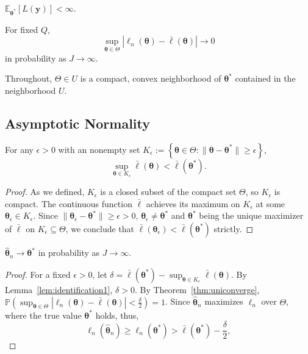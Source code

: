 \begin{proposition}
    $\mathbb{E}_{\bm{\theta}^{*}}[L(\bm{y})]<\infty$.
\end{proposition}

\begin{theorem}
    For fixed $Q$,
    \begin{equation*}
        \sup_{\bm{\theta}\in \Theta}|\ell_{n}(\bm{\theta})-\bar{\ell}(\bm{\theta})|\to 0
    \end{equation*}
    in probability as $J\to \infty$.
    \label{thm:uniconverge}
\end{theorem}

Throughout, $\Theta\in U$ is a compact, convex neighborhood of $\bm{\theta}^{*}$ contained in the neighborhood $U$. 

\subsection{Asymptotic Normality}

\begin{lemma}
    For any $\epsilon>0$ with an nonempty set $K_{\epsilon}:=\left\{\bm{\theta}\in \Theta: \|\bm{\theta}-\bm{\theta}^{*}\|\geq \epsilon\right\}$, 
    \begin{equation*}
        \sup_{\bm{\theta}\in K_{\epsilon}}\bar{\ell}(\bm{\theta})<\bar{\ell}(\bm{\theta}^{*}).
    \end{equation*}
\end{lemma}

\begin{proof}
    As we defined, $K_{\epsilon}$ is a closed subset of the compact set $\Theta$, so $K_{\epsilon}$ is compact. The continuous function $\bar{\ell}$ achieves its maximum on $K_{\epsilon}$ at some $\bm{\theta}_{\epsilon}\in K_{\epsilon}$. Since $\|\bm{\theta}_{\epsilon}-\bm{\theta}^{*}\|\geq \epsilon>0$, $\bm{\theta}_{\epsilon}\neq \bm{\theta}^{*}$ and $\bm{\theta^{*}}$ being the unique maximizer of $\bar{\ell}$ on $K_{\epsilon}\subseteq \Theta$, we conclude that $\bar{\ell}(\bm{\theta}_{\epsilon})<\bar{\ell}(\bm{\theta}^{*})$ strictly.
\end{proof}

\begin{theorem}
    $\hat{\bm{\theta}}_{n}\to \bm{\theta}^{*}$ in probability as $J\to \infty$.
\end{theorem}

\begin{proof}
    For a fixed $\epsilon>0$, let $\delta=\bar{\ell}(\bm{\theta}^{*})-\sup_{\bm{\theta}\in K_{\epsilon}}\bar{\ell}(\bm{\theta})$. By Lemma~\ref{lem:identification1}, $\delta>0$. By Theorem~\ref{thm:uniconverge}, $\mathbb{P}\left(\sup_{\bm{\theta}\in \Theta}|\ell_{n}(\bm{\theta})-\bar{\ell}(\bm{\theta})|< \frac{\delta}{2}\right)=1$. Since $\hat{\bm{\theta}}_{n}$ maximizes $\ell_{n}$ over $\Theta$, where the true value $\bm{\theta}^{*}$ holds, thus,
    \begin{equation*}
        \ell_{n}(\hat{\bm{\theta}}_{n})\geq \ell_{n}(\bm{\theta}^{*})>\bar{\ell}(\bm{\theta}^{*})-\dfrac{\delta}{2},
    \end{equation*}
\end{proof}
\fi
\iffalse
